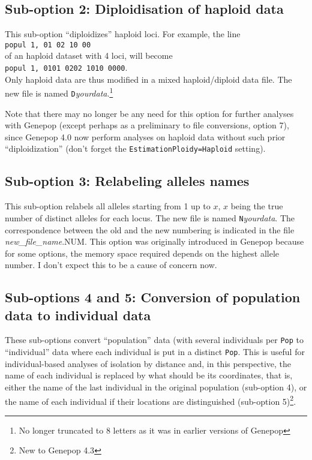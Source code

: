 \documentclass[12pt,]{book}
\let\rmarkdownfootnote\footnote%
\def\footnote{\protect\rmarkdownfootnote}
\begin{document}
\subsection{Sub-option 2: Diploidisation of haploid
data}\label{sub-option-2-diploidisation-of-haploid-data}

 This sub-option ``diploidizes'' haploid
loci. For example, the line\\
\texttt{popul\ 1,\ 01\ 02\ 10\ 00}\\
of an haploid dataset with 4 loci, will become\\
\texttt{popul\ 1,\ 0101\ 0202\ 1010\ 0000}.\\
Only haploid data are thus modified in a mixed haploid/diploid data
file. The new file is named \texttt{D}\emph{yourdata}.\footnote{No
  longer truncated to 8 letters as it was in earlier versions of Genepop}

Note that there may no longer be any need for this option for further
analyses with Genepop (except perhaps as a preliminary to file
conversions, option 7), since Genepop 4.0 now perform analyses on
haploid data without such prior ``diploidization'' (don't forget the
\texttt{EstimationPloidy=Haploid} setting).

\subsection{Sub-option 3: Relabeling alleles
names}\label{sub-option-3-relabeling-alleles-names}

 This sub-option relabels all alleles starting
from 1 up to \(x\), \(x\) being the true number of distinct alleles for
each locus. The new file is named \texttt{N}\emph{yourdata}. The
correspondence between the old and the new numbering is indicated in the
file \emph{new\_file\_name}.NUM. This option was originally introduced
in Genepop because for some options, the memory space required depends
on the highest allele number. I don't expect this to be a cause of
concern now.

\subsection{Sub-options 4 and 5: Conversion of population data to
individual
data}\label{sub-options-4-and-5-conversion-of-population-data-to-individual-data}

 These
sub-options convert ``population'' data (with several individuals per
\texttt{Pop} to ``individual'' data where each individual is put in a
distinct \texttt{Pop}. This is useful for individual-based analyses of
isolation by distance and, in this perspective, the name of each
individual is replaced by what should be its coordinates, that is,
either the name of the last individual in the original population
(sub-option 4), or the name of each individual if their locations are
distinguished (sub-option 5)\footnote{New to Genepop 4.3}.
\end{document}
